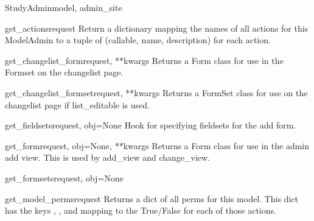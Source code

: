 \documentclass[letterpaper,10pt,english]{sphinxmanual}
\begin{document}
\begin{classdesc}{StudyAdmin}{model, admin\_site}
\hypertarget{data.admin.StudyAdmin.get_actions}{}\begin{methoddesc}{get\_actions}{request}
Return a dictionary mapping the names of all actions for this
ModelAdmin to a tuple of (callable, name, description) for each action.
\end{methoddesc}

\hypertarget{data.admin.StudyAdmin.get_changelist_form}{}\begin{methoddesc}{get\_changelist\_form}{request, **kwargs}
Returns a Form class for use in the Formset on the changelist page.
\end{methoddesc}

\hypertarget{data.admin.StudyAdmin.get_changelist_formset}{}\begin{methoddesc}{get\_changelist\_formset}{request, **kwargs}
Returns a FormSet class for use on the changelist page if list\_editable
is used.
\end{methoddesc}

\hypertarget{data.admin.StudyAdmin.get_fieldsets}{}\begin{methoddesc}{get\_fieldsets}{request, obj=None}
Hook for specifying fieldsets for the add form.
\end{methoddesc}

\hypertarget{data.admin.StudyAdmin.get_form}{}\begin{methoddesc}{get\_form}{request, obj=None, **kwargs}
Returns a Form class for use in the admin add view. This is used by
add\_view and change\_view.
\end{methoddesc}

\hypertarget{data.admin.StudyAdmin.get_formsets}{}\begin{methoddesc}{get\_formsets}{request, obj=None}\end{methoddesc}

\hypertarget{data.admin.StudyAdmin.get_model_perms}{}\begin{methoddesc}{get\_model\_perms}{request}
Returns a dict of all perms for this model. This dict has the keys
, , and  mapping to the True/False for each
of those actions.
\end{methoddesc}


\end{classdesc}
\end{document}
